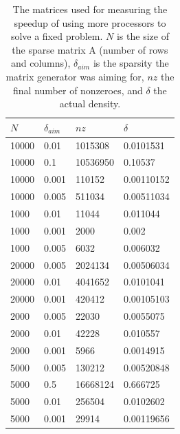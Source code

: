 \documentclass[a4paper]{article}
\begin{document}
\begin{table}
    \centering
    \begin{tabular}{l|l|l|l}
        $N$ & $\delta_{aim}$ & $nz$ & $\delta$ \\ \hline
10000  &  0.01  &    1015308   &   0.0101531\\
10000  &  0.1  &    10536950   &   0.10537\\
10000  &  0.001  &    110152   &   0.00110152\\
10000  &  0.005  &    511034   &   0.00511034\\
1000  &   0.01  &   11044   &   0.011044\\
1000  &   0.001  &   2000   &   0.002\\
1000  &   0.005  &   6032   &   0.006032\\
20000  &  0.005  &    2024134   &   0.00506034\\
20000  &  0.01  &    4041652   &   0.0101041\\
20000  &  0.001  &    420412   &   0.00105103\\
2000  &   0.005  &   22030   &   0.0055075\\
2000  &   0.01  &   42228   &   0.010557\\
2000  &   0.001 &   5966   &   0.0014915\\
5000  &   0.005  &   130212   &   0.00520848\\
5000  &   0.5  &   16668124   &   0.666725\\
5000  &   0.01  &   256504   &   0.0102602\\
5000  &   0.001  &   29914   &   0.00119656\\
    \end{tabular}
    \caption{The matrices used for measuring the speedup of using more processors to solve a fixed problem. $N$ is the size of the sparse matrix \mat A (number of rows and columns), $\delta_{aim}$ is the sparsity the matrix generator was aiming for, $nz$ the final number of nonzeroes, and $\delta$ the actual density. }
    \label{tab:time-run}
\end{table}
\end{document}
